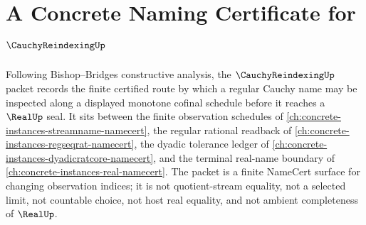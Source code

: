 \chapter{A Concrete Naming Certificate for $\CauchyReindexingUp$}
\label{ch:concrete-instances-cauchy-reindexing-namecert}

Following Bishop--Bridges constructive analysis, the $\CauchyReindexingUp$ packet records the finite certified route by which a regular Cauchy name may be inspected along a displayed monotone cofinal schedule before it reaches a $\RealUp$ seal. It sits between the finite observation schedules of \autoref{ch:concrete-instances-streamname-namecert}, the regular rational readback of \autoref{ch:concrete-instances-regseqrat-namecert}, the dyadic tolerance ledger of \autoref{ch:concrete-instances-dyadicratcore-namecert}, and the terminal real-name boundary of \autoref{ch:concrete-instances-real-namecert}. The packet is a finite NameCert surface for changing observation indices; it is not quotient-stream equality, not a selected limit, not countable choice, not host real equality, and not ambient completeness of $\RealUp$.

